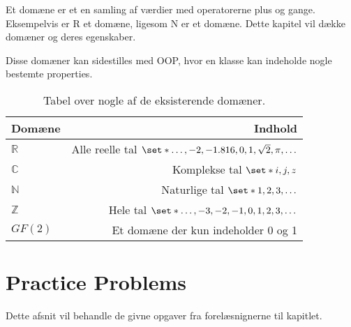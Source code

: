 Et domæne er et en samling af værdier med operatorerne plus og gange.
Eksempelvis er $\mathrm{R}$ et domæne, ligesom $ \mathrm{N}$ er et domæne.
Dette kapitel vil dække domæner og deres egenskaber.

Disse domæner kan sidestilles med OOP, hvor en klasse kan indeholde nogle bestemte properties.
\begin{table}[h]
    \centering
    \begin{tabular}{|l|r|}
        \hline
        Domæne & Indhold\\\hline
        $\mathbb{R}$ & Alle reelle tal $\set*{\dots,-2,-1.816,0,1,\sqrt{2},\pi,\dots}$\\
        $\mathbb{C}$ & Komplekse tal $\set*{i,j,z}$\\
        $\mathbb{N}$ & Naturlige tal $\set*{1,2,3,\dots}$\\
        $\mathbb{Z}$ & Hele tal $\set*{\dots,-3,-2,-1,0,1,2,3,\dots}$\\
        $GF(2)$ & Et domæne der kun indeholder 0 og 1\\
        \hline
    \end{tabular}
    \label{tab:fields}
    \caption{Tabel over nogle af de eksisterende domæner.}
\end{table}




\section{Practice Problems}
Dette afsnit vil behandle de givne opgaver fra forelæsnignerne til kapitlet.
